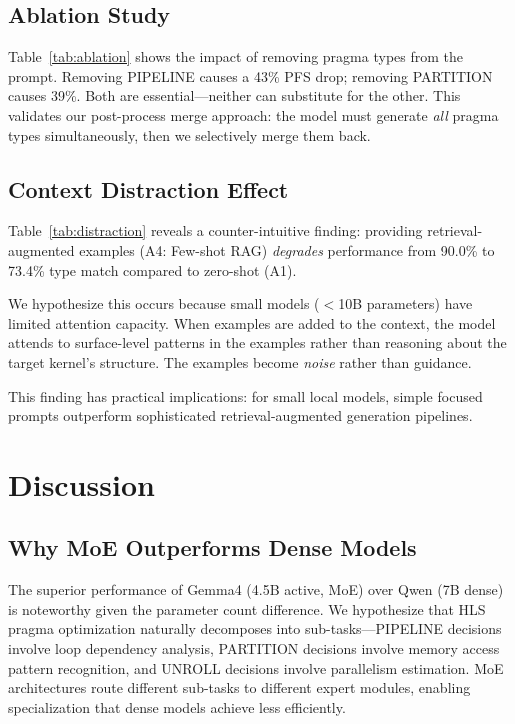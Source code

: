 \documentclass[conference]{IEEEtran}
\begin{document}
\subsection{Ablation Study}

Table~\ref{tab:ablation} shows the impact of removing pragma types from
the prompt. Removing PIPELINE causes a 43\% PFS drop; removing PARTITION
causes 39\%. Both are essential---neither can substitute for the other.
This validates our post-process merge approach: the model must generate
\emph{all} pragma types simultaneously, then we selectively merge them back.

\subsection{Context Distraction Effect}

Table~\ref{tab:distraction} reveals a counter-intuitive finding: providing
retrieval-augmented examples (A4: Few-shot RAG) \emph{degrades} performance
from 90.0\% to 73.4\% type match compared to zero-shot (A1).

We hypothesize this occurs because small models ($<$10B parameters) have
limited attention capacity. When examples are added to the context, the
model attends to surface-level patterns in the examples rather than
reasoning about the target kernel's structure. The examples become
\emph{noise} rather than guidance.

This finding has practical implications: for small local models,
simple focused prompts outperform sophisticated retrieval-augmented
generation pipelines.

\section{Discussion}

\subsection{Why MoE Outperforms Dense Models}

The superior performance of Gemma4 (4.5B active, MoE) over Qwen (7B dense)
is noteworthy given the parameter count difference. We hypothesize that
HLS pragma optimization naturally decomposes into sub-tasks---PIPELINE
decisions involve loop dependency analysis, PARTITION decisions involve
memory access pattern recognition, and UNROLL decisions involve
parallelism estimation. MoE architectures route different sub-tasks to
different expert modules, enabling specialization that dense models
achieve less efficiently.
\end{document}
